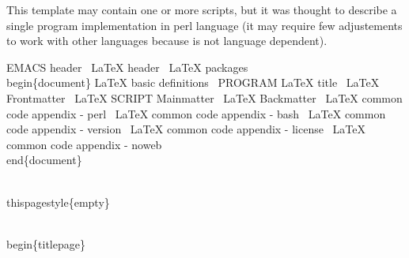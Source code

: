 \documentclass[11pt]{article}
\def\nwendcode{\endtrivlist \endgroup} %
\let\nwdocspar=\par                    %
\begin{document}
This template may contain one or more scripts, but it was thought to describe a single program implementation in perl language (it may require few adjustements to work with other languages because {\noweb} is not language dependent).

\nwenddocs{}\endmoddef
\LA{}EMACS header~{\nwtagstyle{}}\RA{}
\LA{}LaTeX header~{\nwtagstyle{}}\RA{}
\LA{}LaTeX packages~{\nwtagstyle{}}\RA{}
%
%
\\begin\{document\}
%
\LA{}LaTeX basic definitions~{\nwtagstyle{}}\RA{}
\LA{}PROGRAM LaTeX title~{\nwtagstyle{}}\RA{}
%
\LA{}LaTeX Frontmatter~{\nwtagstyle{}}\RA{}
\LA{}LaTeX SCRIPT Mainmatter~{\nwtagstyle{}}\RA{}
\LA{}LaTeX Backmatter~{\nwtagstyle{}}\RA{}
%
\LA{}LaTeX common code appendix - perl~{\nwtagstyle{}}\RA{}
\LA{}LaTeX common code appendix - bash~{\nwtagstyle{}}\RA{}
\LA{}LaTeX common code appendix - version~{\nwtagstyle{}}\RA{}
\LA{}LaTeX common code appendix - license~{\nwtagstyle{}}\RA{}
\LA{}LaTeX common code appendix - noweb~{\nwtagstyle{}}\RA{}
%
\\end\{document\}
%
\nwendcode{}\nwdocspar

\nwenddocs{}\endmoddef
\\thispagestyle\{empty\}

\\begin\{titlepage\}
\end{document}
